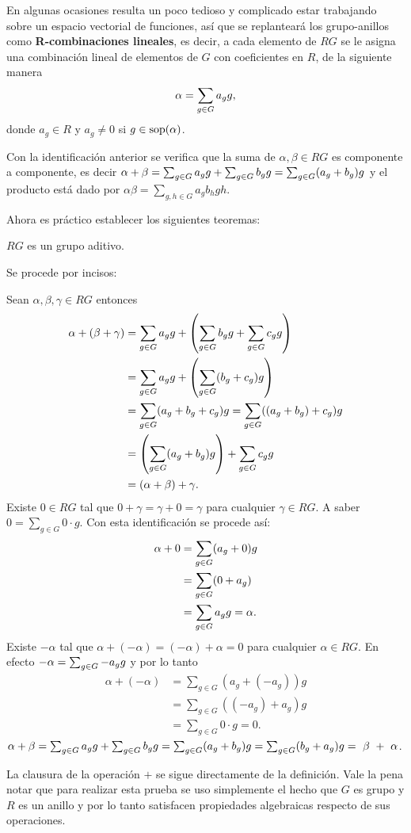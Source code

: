 En algunas ocasiones resulta un poco tedioso y complicado estar trabajando sobre un espacio vectorial de funciones, así que se replanteará los grupo-anillos como \textbf{R-combinaciones lineales}, es decir, a cada elemento de $RG$ se le asigna una combinación lineal de elementos de $G$ con coeficientes en $R$, de la siguiente manera
\begin{equation}
\alpha = \sum_{g \in G} a_{g} g,
\end{equation}
donde $a_g \in R$ y $a_g \neq 0$ si $g \in \operatorname{sop} (\alpha)$.
\begin{nota}
Con la identificación anterior se verifica que la suma de $\alpha, \beta \in RG$ es componente a componente, es decir $\alpha + \beta= \sum_{g \in G} a_{g} g+\sum_{g \in G} b_{g} g= \sum_{g\in G} (a_g+b_g)g $ y el producto está dado por $\alpha\beta=\sum_{g,h\in G}a_gb_hgh$.
\end{nota}
Ahora es práctico establecer los siguientes teoremas:
\begin{teorema}\label{grupo}
$RG$ es un grupo aditivo.
\end{teorema}
\begin{proof*}
Se procede por incisos:
\begin{bulletList}
\newItem  Sean $\alpha, \beta, \gamma \in RG$ entonces 
\begin{align*}
\alpha+(\beta+\gamma)&=\sum_{g \in G} a_{g} g+\left(\sum_{g \in G} b_{g} g+ \sum_{g \in G} c_{g} g \right)\\
&=\sum_{g \in G} a_{g} g+\left(\sum_{g\in G}(b_g+c_g)g\right)\\
&=\sum_{g\in G}(a_g+b_g+c_g)g= \sum_{g\in G}((a_g+b_g)+c_g)g\\
&=\left(\sum_{g\in G}(a_g+b_g)g \right) +\sum_{g \in G} c_{g} g\\
&=(\alpha+\beta)+\gamma.  
\end{align*}
\newItem Existe $0 \in RG$ tal que $0+\gamma=\gamma+0=\gamma$ para cualquier $\gamma \in RG$. A saber $0=\sum_{g \in G}0\cdot g$. Con esta identificación se procede así: 
\begin{align*}
\alpha + 0 &= \sum_{g \in G}(a_g+0)g \\
&=\sum_{g\in G}(0+a_g)\\
&=\sum_{g \in G} a_{g} g=\alpha.
\end{align*}
\newItem Existe $-\alpha$ tal que $\alpha+(-\alpha)= (-\alpha)+\alpha =0$ para cualquier $\alpha \in RG$. En efecto $-\alpha = \sum_{g \in G} -a_{g} g$ y por lo tanto
\begin{align*}
\alpha+ (-\alpha)&=\sum_{g\in G}(a_g+(-a_g) )g\\
&= \sum_{g\in G}((-a_g)+a_g)g\\ 
&= \sum_{g \in G}0\cdot g = 0.
\end{align*} 
\newItem $\alpha + \beta = \sum_{g \in G} a_{g} g+\sum_{g \in G} b_{g} g=\sum_{g \in G}(a_g+b_g)g= \sum_{g \in G}(b_g+a_g)g=~\beta ~+~ \alpha $.\qedhere
\end{bulletList}
\end{proof*}
La clausura de la operación $+$  se sigue directamente de la definición. Vale la pena notar que para realizar esta prueba se uso simplemente el hecho que $G$ es grupo y $R$ es un anillo y por lo tanto satisfacen propiedades algebraicas respecto de sus operaciones.

